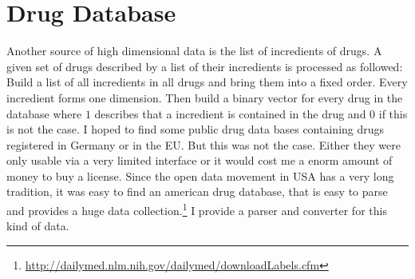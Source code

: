 \section{Drug Database}
Another source of high dimensional data is the list of incredients of drugs. A given set of drugs described by a list of their incredients is processed as followed: Build a list of all incredients in all drugs and bring them into a fixed order. Every incredient forms one dimension. Then build a binary vector for every drug in the database where $1$ describes that a incredient is contained in the drug and $0$ if this is not the case.
I hoped to find some public drug data bases containing drugs registered in Germany or in the EU. But this was not the case. Either they were only usable via a very limited interface or it would cost me a enorm amount of money to buy a license. Since the open data movement in USA has a very long tradition, it was easy to find an american drug database, that is easy to parse and provides a huge data collection.\footnote{\url{http://dailymed.nlm.nih.gov/dailymed/downloadLabels.cfm}} I provide a parser and converter for this kind of data.

